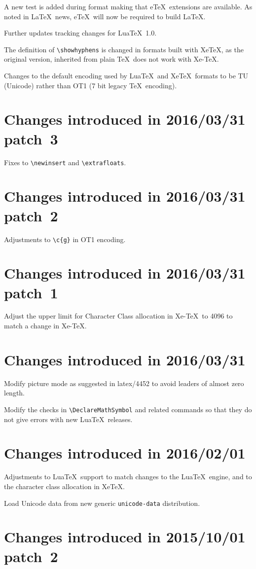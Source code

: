 \documentclass{ltxguide}
\begin{document}
A new test is added during format making that e\TeX\ extensions are
available. As noted in \LaTeX\ news, e\TeX\ will now be required to
build \LaTeX.

Further updates tracking changes for Lua\TeX~1.0.

The definition of \verb|\showhyphens| is changed in formats built
with Xe\TeX, as the original version, inherited from plain \TeX\ does
not work with Xe-\TeX.

Changes to the default encoding used by Lua\TeX\ and Xe\TeX\ formats to
be TU (Unicode) rather than OT1 (7 bit legacy \TeX\ encoding).

\section{Changes  introduced in 2016/03/31 patch~3}
Fixes to \verb|\newinsert| and \verb|\extrafloats|.

\section{Changes  introduced in 2016/03/31 patch~2}
Adjustments to \verb|\c{g}| in OT1 encoding.

\section{Changes  introduced in 2016/03/31 patch~1}
Adjust the upper limit for Character Class allocation in Xe-\TeX\ to
4096 to match a change in Xe-\TeX.

\section{Changes  introduced in 2016/03/31}
Modify picture mode as suggested in latex/4452 to avoid leaders of
almost zero length.

Modify the checks in \verb|\DeclareMathSymbol| and related commands
so that they do not give errors with new Lua\TeX\ releases.

\section{Changes  introduced in 2016/02/01}
Adjustments to Lua\TeX\ support to match changes to the Lua\TeX\ engine,
and to the character class allocation in Xe\TeX.

Load Unicode data from new generic \texttt{unicode-data} distribution.

\section{Changes  introduced in 2015/10/01 patch~2}
\end{document}
